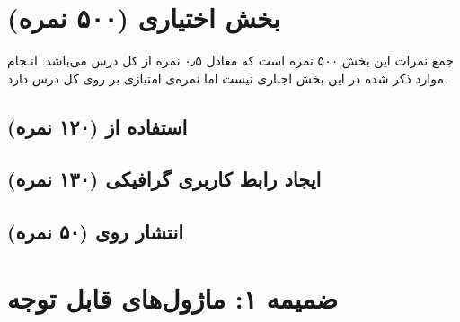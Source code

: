 \documentclass{report}[a4paper]
\begin{document}
\chapter{بخش اختیاری (۵۰۰ نمره)}
\begin{center}
    \begin{warningbox}
        \Large
        جمع نمرات این بخش ۵۰۰ نمره است که معادل ۰٫۵ نمره از کل درس می‌باشد.
        انـجام موارد ذکر شده در این بخش اجباری نیست اما نمره‌ی امتیازی بر روی کل درس دارد.
    \end{warningbox}
\end{center}

\section{استفاده از  (۱۲۰ نمره)}

\section{ایجاد رابط کاربری گرافیکی (۱۳۰ نمره)}

\section{انتشار روی  (۵۰ نمره)}


\chapter{ضمیمه ۱: ماژول‌های قابل توجه}
\end{document}
